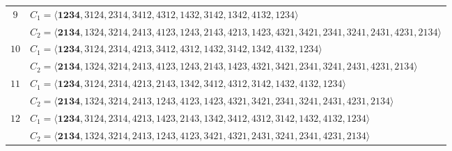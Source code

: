 \documentclass[12pt,a4paper]{amsart}
\theoremstyle{definition}
\begin{document}
\begin{table}[H]
\begin{adjustbox}{angle=90,max height=\textheight}
\begin{minipage}{\textheight}
\begin{tabular}{@{}c l@{}}
$9$ &
$C_1=\langle\mathbf{1234},3124,2314,3412,4312,1432,3142,1342,4132,1234\rangle$\\
&
$C_2=\langle\mathbf{2134},1324,3214,2413,4123,1243,2143,4213,1423,4321,3421,2341,3241,2431,4231,2134\rangle$
\\\midrule

$10$ &
$C_1=\langle\mathbf{1234},3124,2314,4213,3412,4312,1432,3142,1342,4132,1234\rangle$\\
&
$C_2=\langle\mathbf{2134},1324,3214,2413,4123,1243,2143,1423,4321,3421,2341,3241,2431,4231,2134\rangle$
\\\midrule

$11$ &
$C_1=\langle\mathbf{1234},3124,2314,4213,2143,1342,3412,4312,3142,1432,4132,1234\rangle$\\
&
$C_2=\langle\mathbf{2134},1324,3214,2413,1243,4123,1423,4321,3421,2341,3241,2431,4231,2134\rangle$
\\\midrule

$12$ &
$C_1=\langle\mathbf{1234},3124,2314,4213,1423,2143,1342,3412,4312,3142,1432,4132,1234\rangle$\\
&
$C_2=\langle\mathbf{2134},1324,3214,2413,1243,4123,3421,4321,2431,3241,2341,4231,2134\rangle$
\\

\bottomrule
\end{tabular}

\end{minipage} %
\end{adjustbox}
\end{table}
\end{document}
